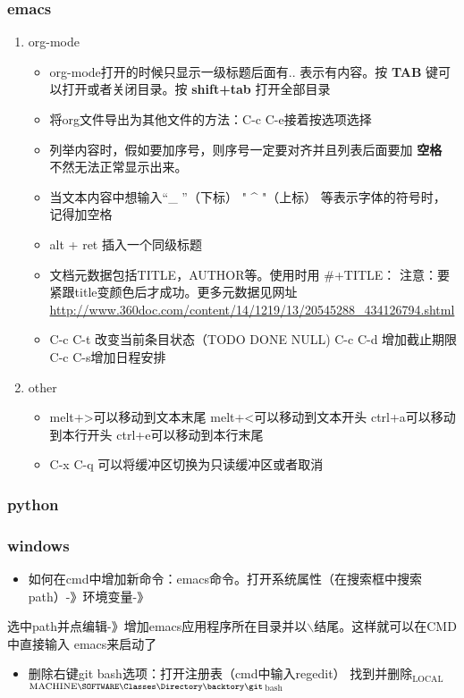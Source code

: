 \documentclass[11pt]{article}
\begin{document}
\subsubsection{emacs}
\label{sec-1-2-3}
\begin{enumerate}
\item org-mode
\label{sec-1-2-3-1}
\begin{itemize}
\item org-mode打开的时候只显示一级标题后面有.. 表示有内容。按 \textbf{TAB} 键可以打开或者关闭目录。按 \textbf{shift+tab} 打开全部目录
\item 将org文件导出为其他文件的方法：C-c C-e接着按选项选择
\item 列举内容时，假如要加序号，则序号一定要对齐并且列表后面要加 \textbf{空格} 不然无法正常显示出来。
\item 当文本内容中想输入“\_ ”（下标） " \^{} "（上标） 等表示字体的符号时，记得加空格
\item alt + ret 插入一个同级标题
\item 文档元数据包括TITLE，AUTHOR等。使用时用 \#+TITLE： 注意：要紧跟title变颜色后才成功。更多元数据见网址 \url{http://www.360doc.com/content/14/1219/13/20545288_434126794.shtml}
\item C-c C-t 改变当前条目状态（TODO DONE NULL) C-c C-d 增加截止期限 C-c C-s增加日程安排
\end{itemize}
\item other
\label{sec-1-2-3-2}
\begin{itemize}
\item melt+>可以移动到文本末尾 melt+<可以移动到文本开头
ctrl+a可以移动到本行开头 ctrl+e可以移动到本行末尾
\item C-x C-q 可以将缓冲区切换为只读缓冲区或者取消
\end{itemize}
\end{enumerate}

\subsubsection{python}
\label{sec-1-2-4}
\subsubsection{windows}
\label{sec-1-2-5}
\begin{itemize}
\item 如何在cmd中增加新命令：emacs命令。打开系统属性（在搜索框中搜索path）-》环境变量-》
\end{itemize}
选中path并点编辑-》增加emacs应用程序所在目录并以$\backslash$结尾。这样就可以在CMD中直接输入
emacs来启动了
\begin{itemize}
\item 删除右键git bash选项：打开注册表（cmd中输入regedit） 找到并删除\HKEY$_{\text{LOCAL}}$$_{\text{MACHINE}\SOFTWARE\Classes\Directory\backtory\git}$$_{\text{bash}}$
\end{itemize}
\end{document}
